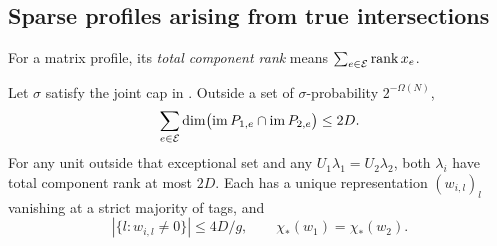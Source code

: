 \subsection{Sparse profiles arising from true intersections}

For a matrix profile, its \emph{total component rank} means \(\sum_{e\in\mathcal E}\operatorname{rank} x_e\).

\begin{lemma}\label{lem:raw-intersections}
Let \(\sigma\) satisfy the joint cap in .
Outside a set of \(\sigma\)-probability \(2^{-\Omega(N)}\),
\[
 \sum_{e\in\mathcal E}
  \dim\bigl(\operatorname{im} P_{1,e}\cap\operatorname{im} P_{2,e}\bigr)\le2D.
\]
For any unit outside that exceptional set and any
\(U_1\lambda_1=U_2\lambda_2\), both \(\lambda_i\) have total component rank at most \(2D\).
Each has a unique representation \((w_{i,l})_l\) vanishing at a strict majority of tags, and
\[
 |\{l:w_{i,l}\ne0\}|\le4D/g,\qquad
 \chi_*(w_1)=\chi_*(w_2).
\]
\end{lemma}
